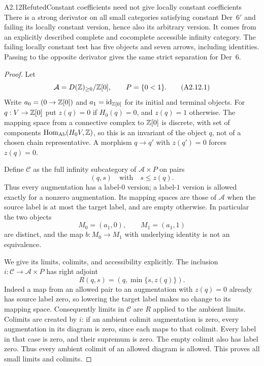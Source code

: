 \begin{claim}{A2.12}{Refuted}{Constant coefficients need not give locally constant coefficients}
\label{A2-constant-counterexample}
There is a strong derivator on all small categories satisfying constant
Der~$6'$ and failing its locally constant version, hence also its arbitrary
version. It comes from an explicitly described complete and cocomplete
accessible infinity category. The failing locally constant test has five
objects and seven arrows, including identities. Passing to the opposite
derivator gives the same strict separation for Der~6.
\end{claim}
\begin{proof}
Let
\[
 \mathcal A=D(\mathbb Z)_{\ge0}/\mathbb Z[0],\qquad P=\{0<1\}.
 \tag{A2.12.1}
\]
Write $a_0=(0\to\mathbb Z[0])$ and $a_1=\operatorname{id}_{\mathbb Z[0]}$ for its initial and terminal
objects. For $q:V\to\mathbb Z[0]$ put
$z(q)=0$ if $H_0(q)=0$, and $z(q)=1$ otherwise.
The mapping space from a connective complex to $\mathbb Z[0]$ is discrete,
with set of components $\operatorname{Hom}_{\mathrm{Ab}}(H_0V,\mathbb Z)$, so this is an invariant of
the object $q$, not of a chosen chain representative. A morphism $q\to q'$
with $z(q')=0$ forces $z(q)=0$.

Define $\mathcal C$ as the full infinity subcategory of $\mathcal A\times P$
on pairs
\[
 (q,s)\quad\text{with}\quad s\le z(q).
 \tag{A2.12.2}
\]
Thus every augmentation has a label-$0$ version; a label-$1$ version
is allowed exactly for a nonzero augmentation. Its mapping spaces are
those of $\mathcal A$ when the source label is at most the target label,
and are empty otherwise. In particular the two objects
\[
 M_0=(a_1,0),\qquad M_1=(a_1,1)
 \tag{A2.12.3}
\]
are distinct, and the map $b:M_0\to M_1$ with underlying identity is not
an equivalence.

We give its limits, colimits, and accessibility explicitly. The inclusion
$i:\mathcal C\to\mathcal A\times P$ has right adjoint
\[
 R(q,s)=(q,\min\{s,z(q)\}).
 \tag{A2.12.4}
\]
Indeed a map from an allowed pair to an augmentation with $z(q)=0$
already has source label zero, so lowering the target label makes no
change to its mapping space. Consequently limits in $\mathcal C$ are
$R$ applied to the ambient limits. Colimits are created by $i$:
if an ambient colimit augmentation is zero, every augmentation in its
diagram is zero, since each maps to that colimit. Every label in that
case is zero, and their supremum is zero. The empty colimit also has
label zero. Thus every ambient colimit of an allowed diagram is allowed.
This proves all small limits and colimits.


\end{proof}
